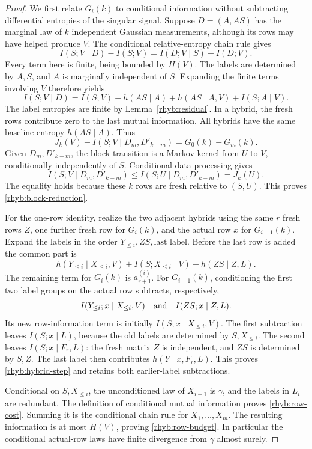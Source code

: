 \begin{proof}
We first relate \(G_i(k)\) to conditional information without
subtracting differential entropies of the singular signal.  Suppose
\(D=(A,AS)\) has the marginal law of \(k\) independent Gaussian
measurements, although its rows may have helped produce \(V\).  The
conditional relative-entropy chain rule gives
\[
 I(S;V\mid D)-I(S;V)=I(D;V\mid S)-I(D;V).
\]
Every term here is finite, being bounded by \(H(V)\).  The labels are
determined by \(A,S\), and \(A\) is marginally independent of \(S\).
Expanding the finite terms involving \(V\) therefore yields
\begin{equation}\label{rhyb:information-identity}
 I(S;V\mid D)=I(S;V)-h(AS\mid A)+h(AS\mid A,V)+I(S;A\mid V).
\end{equation}
The label entropies are finite by Lemma~\ref{rhyb:residual}.
In a hybrid, the fresh rows contribute zero to the last mutual
information.  All hybrids have the same baseline entropy \(h(AS\mid A)\).
Thus
\[
 J_k(V)-I(S;V\mid D_m,D'_{k-m})=G_0(k)-G_m(k).
\]
Given \(D_m,D'_{k-m}\), the block transition is a Markov kernel from
\(U\) to \(V\), conditionally independently of \(S\).  Conditional
data processing gives
\[
 I(S;V\mid D_m,D'_{k-m})
 \le I(S;U\mid D_m,D'_{k-m})=J_k(U).
\]
The equality holds because these \(k\) rows are fresh relative to
\((S,U)\).  This proves \eqref{rhyb:block-reduction}.

For the one-row identity, realize the two adjacent hybrids using the
same \(r\) fresh rows \(Z\), one further fresh row for \(G_i(k)\), and
the actual row \(x\) for \(G_{i+1}(k)\).  Expand the labels in the order
\(Y_{\le i},ZS,\text{last label}\).  Before the last row is added the
common part is
\[
 h(Y_{\le i}\mid X_{\le i},V)
 +I(S;X_{\le i}\mid V)+h(ZS\mid Z,L).
\]
The remaining term for \(G_i(k)\) is \(a_{r+1}^{(i)}\).
For \(G_{i+1}(k)\), conditioning the first two label groups on the
actual row subtracts, respectively,
\[
 I(Y_{\le i};x\mid X_{\le i},V)
 \quad\hbox{and}\quad I(ZS;x\mid Z,L).
\]
Its new row-information term is initially
\(I(S;x\mid X_{\le i},V)\).  The first subtraction leaves \(I(S;x\mid L)\),
because the old labels are determined by \(S,X_{\le i}\).
The second leaves \(I(S;x\mid F_r,L)\): the fresh matrix \(Z\) is
independent, and \(ZS\) is determined by \(S,Z\).  The last label then
contributes \(h(Y\mid x,F_r,L)\).  This proves \eqref{rhyb:hybrid-step}
and retains both earlier-label subtractions.

Conditional on \(S,X_{\le i}\), the unconditioned law of \(X_{i+1}\)
is \(\gamma\), and the labels in \(L_i\) are redundant.  The definition
of conditional mutual information proves \eqref{rhyb:row-cost}.
Summing it is the conditional chain rule for \(X_1,\ldots,X_m\).
The resulting information is at most \(H(V)\), proving
\eqref{rhyb:row-budget}.  In particular the conditional actual-row
laws have finite divergence from \(\gamma\) almost surely.
\end{proof}

